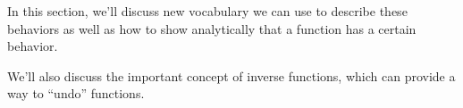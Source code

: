 \documentclass[nooutcomes]{ximera}
\begin{document}
In this section, we'll discuss new vocabulary we can use to describe these behaviors as well as how to show analytically that a function has a certain behavior. 

We'll also discuss the important concept of inverse functions, which can provide a way to ``undo'' functions. 

%
%
%
%
%
%
%
%
%
%
\end{document}
